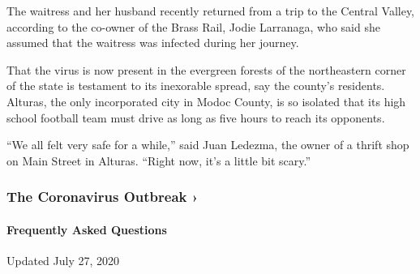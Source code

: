 The waitress and her husband recently returned from a trip to the
Central Valley, according to the co-owner of the Brass Rail, Jodie
Larranaga, who said she assumed that the waitress was infected during
her journey.

That the virus is now present in the evergreen forests of the
northeastern corner of the state is testament to its inexorable spread,
say the county's residents. Alturas, the only incorporated city in Modoc
County, is so isolated that its high school football team must drive as
long as five hours to reach its opponents.

``We all felt very safe for a while,'' said Juan Ledezma, the owner of a
thrift shop on Main Street in Alturas. ``Right now, it's a little bit
scary.''

\href{https://www.nytimes3xbfgragh.onion/news-event/coronavirus?action=click\&pgtype=Article\&state=default\&region=MAIN_CONTENT_3\&context=storylines_faq}{}

\hypertarget{the-coronavirus-outbreak-}{%
\subsubsection{The Coronavirus Outbreak
›}\label{the-coronavirus-outbreak-}}

\hypertarget{frequently-asked-questions}{%
\paragraph{Frequently Asked
Questions}\label{frequently-asked-questions}}

Updated July 27, 2020

